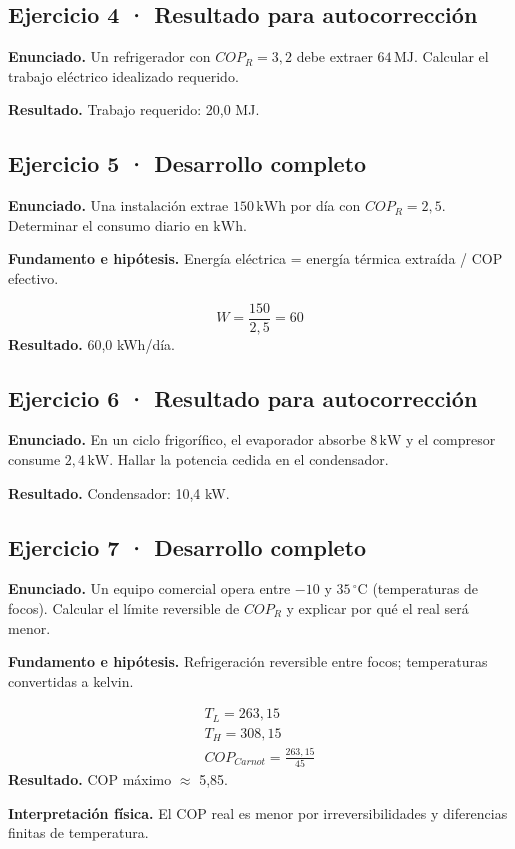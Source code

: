 \documentclass[11pt,a4paper]{article}
\begin{document}
\subsection*{Ejercicio 4 · Resultado para autocorrección}
\textbf{Enunciado.} Un refrigerador con \(COP_R=3{,}2\) debe extraer \(64\,\mathrm{MJ}\). Calcular el trabajo eléctrico idealizado requerido.

\textbf{Resultado.} Trabajo requerido: 20,0 MJ.


\subsection*{Ejercicio 5 · Desarrollo completo}
\textbf{Enunciado.} Una instalación extrae \(150\,\mathrm{kWh}\) por día con \(COP_R=2{,}5\). Determinar el consumo diario en \(\mathrm{kWh}\).

\textbf{Fundamento e hipótesis.} Energía eléctrica = energía térmica extraída / COP efectivo.

\[
W=\frac{150}{2{,}5}=60
\]
\textbf{Resultado.} 60,0 kWh/día.


\subsection*{Ejercicio 6 · Resultado para autocorrección}
\textbf{Enunciado.} En un ciclo frigorífico, el evaporador absorbe \(8\,\mathrm{kW}\) y el compresor consume \(2{,}4\,\mathrm{kW}\). Hallar la potencia cedida en el condensador.

\textbf{Resultado.} Condensador: 10,4 kW.


\subsection*{Ejercicio 7 · Desarrollo completo}
\textbf{Enunciado.} Un equipo comercial opera entre \(-10\) y \(35\,^\circ\mathrm C\) (temperaturas de focos). Calcular el límite reversible de \(COP_R\) y explicar por qué el real será menor.

\textbf{Fundamento e hipótesis.} Refrigeración reversible entre focos; temperaturas convertidas a kelvin.

\[
\begin{gathered}
T_L=263{,}15\\T_H=308{,}15\\COP_{Carnot}=\frac{263{,}15}{45}
\end{gathered}
\]
\textbf{Resultado.} COP máximo \ensuremath{\approx} 5,85.

\textbf{Interpretación física.} El COP real es menor por irreversibilidades y diferencias finitas de temperatura.
\end{document}
